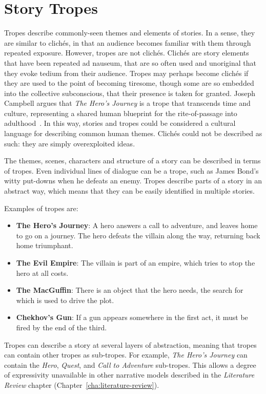 \documentclass[11pt]{report}
\begin{document}
\section{Story Tropes}
\label{sec:tropes-intro}


Tropes describe commonly-seen themes and elements of stories. In a sense, they are similar to clich\'es, in that an audience becomes familiar with them through repeated exposure. However, tropes are not clich\'es. Clich\'es are story elements that have been repeated ad nauseum, that are so often used and unoriginal that they evoke tedium from their audience. Tropes may perhaps become clich\'es if they are used to the point of becoming tiresome, though some are so embedded into the collective subconscious, that their presence is taken for granted. Joseph Campbell argues that \emph{The Hero's Journey} is a trope that transcends time and culture, representing a shared human blueprint for the rite-of-passage into adulthood~\citep{campbell2008hero}. In this way, stories and tropes could be considered a cultural language for describing common human themes. Clich\'es could not be described as such: they are simply overexploited ideas.

The themes, scenes, characters and structure of a story can be described in terms of tropes. Even individual lines of dialogue can be a trope, such as James Bond's witty put-downs when he defeats an enemy. Tropes describe parts of a story in an abstract way, which means that they can be easily identified in multiple stories.

Examples of tropes are:

\begin{itemize}
\item \textbf{The Hero's Journey}: A hero answers a call to adventure, and
  leaves home to go on a journey. The hero defeats the villain along the way, returning back home triumphant.
\item \textbf{The Evil Empire}: The villain is part of an empire, which tries to stop the hero at all costs.
\item \textbf{The MacGuffin}: There is an object that the hero needs, the search for which is used to drive the plot.
\item \textbf{Chekhov's Gun}: If a gun appears somewhere in the first act, it must be fired by the end of the third.
\end{itemize}

Tropes can describe a story at several layers of abstraction, meaning that
tropes can contain other tropes as sub-tropes. For example, \emph{The Hero's
  Journey} can contain the \emph{Hero}, \emph{Quest}, and \emph{Call to
  Adventure} sub-tropes. This allows a degree of expressivity unavailable in
other narrative models described in the \emph{Literature Review} chapter (Chapter~\ref{cha:literature-review}).
\end{document}
